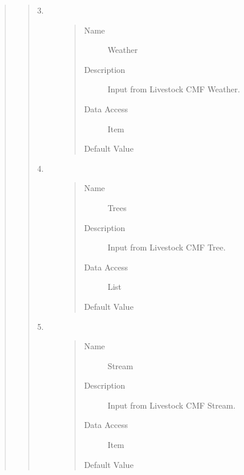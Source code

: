 \documentclass[letterpaper,10pt,english]{sphinxmanual}
\begin{document}
\begin{quote}
\begin{description}
\begin{quote}
\begin{description}
\item[{3.}] \leavevmode\begin{quote}\begin{description}
\item[{Name}] \leavevmode
Weather

\item[{Description}] \leavevmode
Input from Livestock CMF Weather.

\item[{Data Access}] \leavevmode
Item

\item[{Default Value}] \leavevmode
{}

\end{description}\end{quote}

\item[{4.}] \leavevmode\begin{quote}\begin{description}
\item[{Name}] \leavevmode
Trees

\item[{Description}] \leavevmode
Input from Livestock CMF Tree.

\item[{Data Access}] \leavevmode
List

\item[{Default Value}] \leavevmode
{}

\end{description}\end{quote}

\item[{5.}] \leavevmode\begin{quote}\begin{description}
\item[{Name}] \leavevmode
Stream

\item[{Description}] \leavevmode
Input from Livestock CMF Stream. 

\item[{Data Access}] \leavevmode
Item

\item[{Default Value}] \leavevmode
{}


\end{description}
\end{quote}
\end{description}
\end{quote}
\end{description}
\end{quote}
\end{document}
